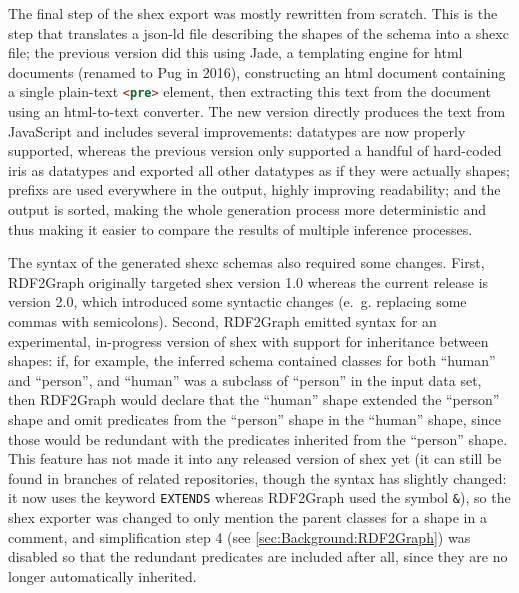 The final step of the \gls{shex} export was mostly rewritten from scratch.
This is the step that translates a \gls{json-ld} file describing the \glspl{shape} of the \gls{schema}
into a \gls{shexc} file;
the previous version did this using Jade,
a templating engine for \gls{html} documents (renamed to Pug in 2016),
constructing an \gls{html} document containing a single plain-text \lstinline[language=html]{<pre>} element,
then extracting this text from the document using an \gls{html}-to-text converter.
The new version directly produces the text from \gls{JavaScript}
and includes several improvements:
datatypes are now properly supported,
whereas the previous version only supported a handful of hard-coded \glspl{iri} as datatypes
and exported all other datatypes as if they were actually \glspl{shape};
\glspl{prefix} are used everywhere in the output, highly improving readability;
and the output is sorted, making the whole generation process more deterministic
and thus making it easier to compare the results of multiple inference processes.

The syntax of the generated \gls{shexc} \glspl{schema}
also required some changes.
First, \gls{RDF2Graph} originally targeted \gls{shex} version 1.0
whereas the current release is version 2.0,
which introduced some syntactic changes
(e.~g. replacing some commas with semicolons).
Second, \gls{RDF2Graph} emitted syntax for an experimental, in-progress version of \gls{shex}
with support for inheritance between \glspl{shape}:
if, for example, the inferred \gls{schema} contained classes for both “human” and “person”,
and “human” was a subclass of “person” in the input data set,
then \gls{RDF2Graph} would declare that the “human” \gls{shape} extended the “person” \gls{shape}
and omit \glspl{predicate} from the “person” \gls{shape} in the “human” \gls{shape},
since those would be redundant with the \glspl{predicate} inherited from the “person” \gls{shape}.
This feature has not made it into any released version of \gls{shex} yet
(it can still be found in  branches of related repositories,
though the syntax has slightly changed:
it now uses the keyword \lstinline{EXTENDS} whereas \gls{RDF2Graph} used the symbol \lstinline{&}),
so the \gls{shex} exporter was changed to only mention the parent classes for a \gls{shape} in a comment,
and simplification step 4 (see \cref{sec:Background:RDF2Graph}) was disabled
so that the redundant \glspl{predicate} are included after all,
since they are no longer automatically inherited.

